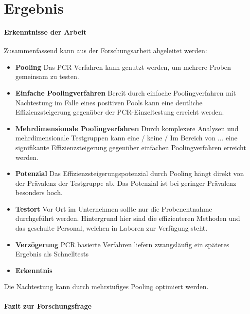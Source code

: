 \chapter{Ergebnis}
\subsubsection{Erkenntnisse der Arbeit}
Zusammenfassend kann aus der Forschungsarbeit abgeleitet werden:

\begin{itemize}
	\item \textbf{Pooling} Das PCR-Verfahren kann genutzt werden, um mehrere Proben gemeinsam zu testen.
	\item \textbf{Einfache Poolingverfahren} Bereit durch einfache Poolingverfahren mit Nachtestung im Falle eines positiven Pools kann eine deutliche Effizienzsteigerung gegenüber der PCR-Einzeltestung erreicht werden.
	\item \textbf{Mehrdimensionale Poolingverfahren} Durch komplexere Analysen und mehrdimensionale Testgruppen kann eine / keine / Im Bereich von ... eine signifikante Effizienzsteigerung gegenüber einfachen Poolingverfahren erreicht werden.
	\item \textbf{Potenzial} Das Effizienzsteigerungspotenzial durch Pooling hängt direkt von der Prävalenz der Testgruppe ab. Das Potenzial ist bei geringer Prävalenz besonders hoch.
	\item \textbf{Testort} Vor Ort im Unternehmen sollte nur die Probenentnahme durchgeführt werden. Hintergrund hier sind die effizienteren Methoden und das geschulte Personal, welchen in Laboren zur Verfügung steht.
	\item \textbf{Verzögerung} PCR basierte Verfahren liefern zwangsläufig ein späteres Ergebnis als Schnelltests
	\item \textbf{Erkenntnis} 
	

	
\end{itemize}
	Die Nachtestung kann durch mehrstufiges Pooling optimiert werden.
\cleardoublepage
\subsubsection{Fazit zur Forschungsfrage}


